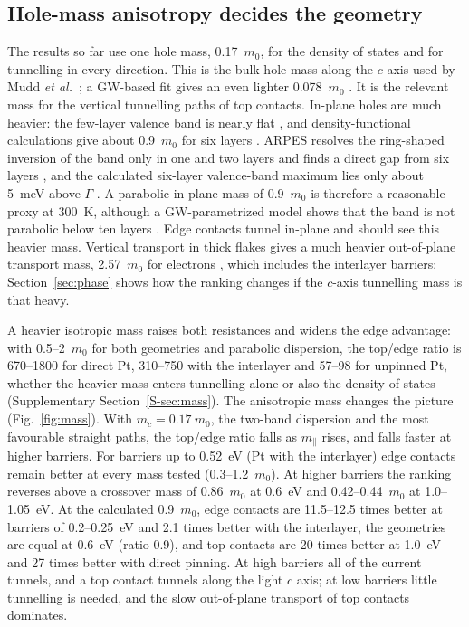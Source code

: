 \documentclass[11pt]{article}
\begin{document}
\subsection{Hole-mass anisotropy decides the geometry}
\label{sec:mass}
The results so far use one hole mass, 0.17~$m_0$, for the density of states and for tunnelling in every direction. This is the bulk hole mass along the $c$ axis used by Mudd \textit{et al.}\ \cite{refmudd2013}; a GW-based fit gives an even lighter 0.078~$m_0$ \cite{refceferino}. It is the relevant mass for the vertical tunnelling paths of top contacts. In-plane holes are much heavier: the few-layer valence band is nearly flat \cite{refmag,refceferino}, and density-functional calculations give about 0.9~$m_0$ for six layers \cite{refpasquale,refpasquale23}. ARPES resolves the ring-shaped inversion of the band only in one and two layers and finds a direct gap from six layers \cite{refhamer}, and the calculated six-layer valence-band maximum lies only about 5~meV above $\Gamma$ \cite{refpasquale}. A parabolic in-plane mass of 0.9~$m_0$ is therefore a reasonable proxy at 300~K, although a GW-parametrized model shows that the band is not parabolic below ten layers \cite{refceferino}. Edge contacts tunnel in-plane and should see this heavier mass. Vertical transport in thick flakes gives a much heavier out-of-plane transport mass, 2.57~$m_0$ for electrons \cite{refsangwan}, which includes the interlayer barriers; Section~\ref{sec:phase} shows how the ranking changes if the $c$-axis tunnelling mass is that heavy.

A heavier isotropic mass raises both resistances and widens the edge advantage: with 0.5--2~$m_0$ for both geometries and parabolic dispersion, the top/edge ratio is 670--1800 for direct Pt, 310--750 with the interlayer and 57--98 for unpinned Pt, whether the heavier mass enters tunnelling alone or also the density of states (Supplementary Section~\ref{S-sec:mass}). The anisotropic mass changes the picture (Fig.~\ref{fig:mass}). With $m_c=0.17~m_0$, the two-band dispersion and the most favourable straight paths, the top/edge ratio falls as $m_\parallel$ rises, and falls faster at higher barriers. For barriers up to 0.52~eV (Pt with the interlayer) edge contacts remain better at every mass tested (0.3--1.2~$m_0$). At higher barriers the ranking reverses above a crossover mass of 0.86~$m_0$ at 0.6~eV and 0.42--0.44~$m_0$ at 1.0--1.05~eV. At the calculated 0.9~$m_0$, edge contacts are 11.5--12.5 times better at barriers of 0.2--0.25~eV and 2.1 times better with the interlayer, the geometries are equal at 0.6~eV (ratio 0.9), and top contacts are 20 times better at 1.0~eV and 27 times better with direct pinning. At high barriers all of the current tunnels, and a top contact tunnels along the light $c$ axis; at low barriers little tunnelling is needed, and the slow out-of-plane transport of top contacts dominates.
\end{document}
